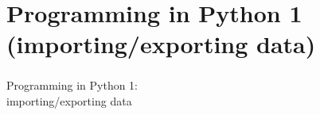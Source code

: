 \section{Programming in Python 1 (importing/exporting data)}

\begin{frame}
\frametitle{}
\huge
Programming in Python 1:\\
importing/exporting data

\end{frame}

\begin{frame}
\frametitle{}

\end{frame}

\begin{frame}
\frametitle{}

\end{frame}


